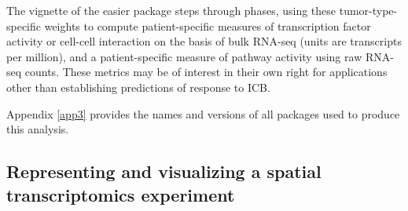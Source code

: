 \begin{Shaded}
\begin{Highlighting}[]
\StringTok{ }\NormalTok{eh[[}\NormalTok{]]}
\NormalTok{(mw[[}\NormalTok{]])                }
\NormalTok{(mw[[}\NormalTok{]]}\OperatorTok{$}\OperatorTok{$}
\end{Highlighting}
\end{Shaded}

The vignette of the easier package steps through phases,
using these tumor-type-specific weights to compute patient-specific measures
of transcription factor activity or cell-cell interaction on the basis of bulk
RNA-seq (units are transcripts per million), and a patient-specific
measure of pathway activity using raw RNA-seq counts. These metrics
may be of interest in their own right for applications other than
establishing predictions of response to ICB.

Appendix \ref{app3} provides the names and versions of all packages
used to produce this analysis.

\subsection{Representing and visualizing a spatial transcriptomics experiment}\label{representing-and-visualizing-a-spatial-transcriptomics-experiment}

